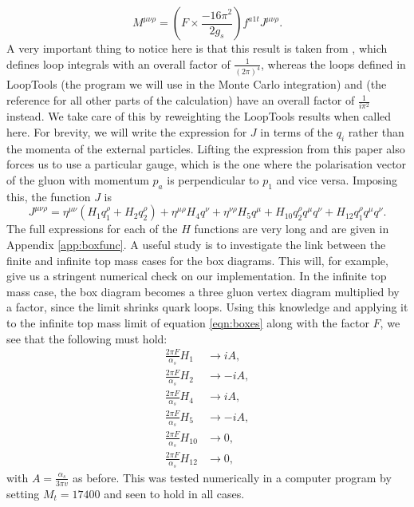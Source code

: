 \begin{equation}
M^{\mu \nu \rho} = \left(F \times \frac{-16 \pi^2}{2 g_s} \right) f^{a1t}J^{\mu \nu \rho}.
\end{equation}
A very important thing to notice here is that this result is taken from \cite{Duca2003}, which defines loop integrals with an overall factor of $\frac{1}{(2 \pi)^4}$, whereas the loops defined in LoopTools \cite{Hahn1999} (the program we will use in the Monte Carlo integration) and \cite{DelDuca2001} (the reference for all other parts of the calculation) have an overall factor of $\frac{1}{i \pi^2}$ instead. We take care of this by reweighting the LoopTools results when called here. For brevity, we will write the expression for $J$ in terms of the $q_i$ rather than the momenta of the external particles. Lifting the expression from this paper also forces us to use a particular gauge, which is the one where the polarisation vector of the gluon with momentum $p_a$ is perpendicular to $p_1$ and vice versa. Imposing this, the function $J$ is %
\begin{equation}
J^{\mu \nu \rho} = \eta^{\mu \nu}(H_1 q_1^\rho + H_2 q_2^\rho) + \eta^{\mu \rho}H_4 q^\nu + \eta^{\nu \rho}H_5 q^\mu + H_{10} q_2^\rho q^\mu q^\nu + H_{12} q_1^\rho q^\mu q^\nu.
\label{eqn:boxes}
\end{equation}
The full expressions for each of the $H$ functions are very long and are given in Appendix \ref{app:boxfunc}. A useful study is to investigate the link between the finite and infinite top mass cases for the box diagrams. This will, for example, give us a stringent numerical check on our implementation. In the infinite top mass case, the box diagram becomes a three gluon vertex diagram multiplied by a factor, since the limit shrinks quark loops. Using this knowledge and applying it to the infinite top mass limit of equation \ref{eqn:boxes} along with the factor $F$, we see that the following must hold: 
\begin{equation}
\begin{split}
\frac{2 \pi F}{\alpha_s} H_1 & \to i A, \\
\frac{2 \pi F}{\alpha_s} H_2  &\to -i A, \\
\frac{2 \pi F}{\alpha_s} H_4  &\to i A, \\
\frac{2 \pi F}{\alpha_s} H_5  &\to -i A, \\
\frac{2 \pi F}{\alpha_s} H_{10} &\to 0, \\
\frac{2 \pi F}{\alpha_s} H_{12} &\to 0,
\end{split}
\end{equation}
with $A = \frac{\alpha_s}{3 \pi v}$ as before. This was tested numerically in a computer program by setting $M_t = 17400$ and seen to hold in all cases. %

